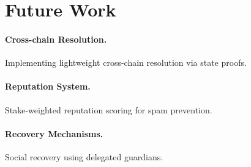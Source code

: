 \section{Future Work}


\paragraph{Cross-chain Resolution.} Implementing lightweight cross-chain resolution via state proofs.

\paragraph{Reputation System.} Stake-weighted reputation scoring for spam prevention.

\paragraph{Recovery Mechanisms.} Social recovery using delegated guardians.

